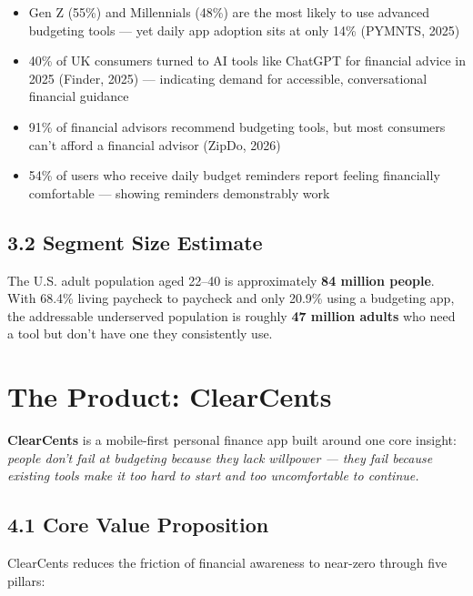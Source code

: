\documentclass[11pt,a4paper]{article}
\begin{document}
\begin{itemize}
  \item Gen Z (55\%) and Millennials (48\%) are the most likely to use advanced budgeting
        tools --- yet daily app adoption sits at only 14\% (PYMNTS, 2025)
  \item 40\% of UK consumers turned to AI tools like ChatGPT for financial advice in 2025
        (Finder, 2025) --- indicating demand for accessible, conversational financial guidance
  \item 91\% of financial advisors recommend budgeting tools, but most consumers can't afford
        a financial advisor (ZipDo, 2026)
  \item 54\% of users who receive daily budget reminders report feeling financially comfortable
        --- showing reminders demonstrably work
\end{itemize}

\subsection{3.2 Segment Size Estimate}

The U.S. adult population aged 22--40 is approximately \textbf{84 million people}. With
68.4\% living paycheck to paycheck and only 20.9\% using a budgeting app, the addressable
underserved population is roughly \textbf{47 million adults} who need a tool but don't have
one they consistently use.

\newpage

\section{The Product: ClearCents}

\textbf{ClearCents} is a mobile-first personal finance app built around one core insight:
\textit{people don't fail at budgeting because they lack willpower --- they fail because
existing tools make it too hard to start and too uncomfortable to continue.}

\subsection{4.1 Core Value Proposition}

ClearCents reduces the friction of financial awareness to near-zero through five pillars:
\end{document}
